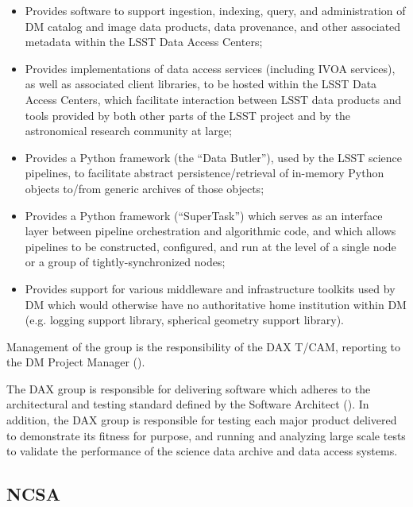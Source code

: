 \begin{itemize}

  \item{Provides software to support ingestion, indexing, query, and administration of DM catalog and image
  data products, data provenance, and other associated metadata within the LSST Data Access Centers;}

  \item{Provides implementations of data access services (including IVOA services), as well as associated
  client libraries, to be hosted within the LSST Data Access Centers, which facilitate interaction between
  LSST data products and tools provided by both other parts of the LSST project and by the astronomical
  research community at large;}

  \item{Provides a Python framework (the ``Data Butler''), used by the LSST science pipelines, to facilitate
  abstract persistence/retrieval of in-memory Python objects to/from generic archives of those objects;}

  \item{Provides a Python framework (``SuperTask'') which serves as an interface layer between pipeline
  orchestration and algorithmic code, and which allows pipelines to be constructed, configured, and run at
  the level of a single node or a group of tightly-synchronized nodes;}

  \item{Provides support for various middleware and infrastructure toolkits used by DM which would otherwise
  have no authoritative home institution within DM (e.g. logging support library, spherical geometry support
  library).}

\end{itemize}

Management of the group is the responsibility of the DAX T/CAM, reporting to the DM Project Manager
().

The DAX group is responsible for delivering software which adheres to the architectural and testing standard
defined by the Software Architect (). In addition, the DAX group is responsible for
testing each major product delivered to demonstrate its fitness for purpose, and running and analyzing large
scale tests to validate the performance of the science data archive and data access systems.

\subsection {NCSA\label{sect:ncsa}}


